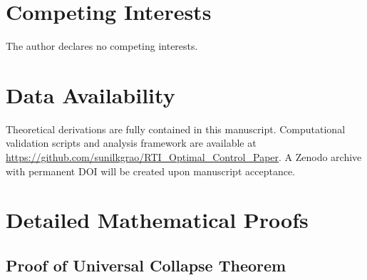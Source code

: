 \documentclass[aps,pre,twocolumn,showpacs,superscriptaddress]{revtex4-2}
\theoremstyle{definition}
\begin{document}
\section*{Competing Interests}
The author declares no competing interests.

\section*{Data Availability}
Theoretical derivations are fully contained in this manuscript. Computational validation scripts and analysis framework are available at \url{https://github.com/sunilkgrao/RTI_Optimal_Control_Paper}. A Zenodo archive with permanent DOI will be created upon manuscript acceptance.

\appendix

\section{Detailed Mathematical Proofs}

\subsection{Proof of Universal Collapse Theorem}
\end{document}
